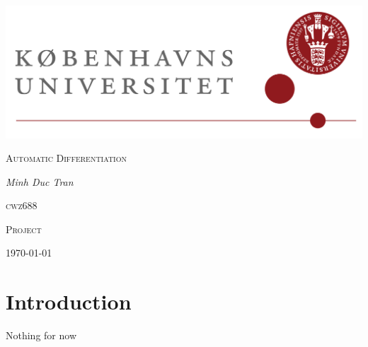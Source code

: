 
\usepackage{hyperref}

\author{Minh}

	\begin{titlepage}
		\centering
		\includegraphics[width=\textwidth]{KuLogo.png}
		\par\vspace{1cm}
		\vspace{1cm}
		{\scshape\Large Automatic Differentiation \\
			\par}
		\vspace{1.5cm}
		{\Large\itshape  Minh Duc Tran }\\
		\vspace{0.5cm}
		{\scshape\large cwz688 \\ \par}
		\vfill
		{\Large\scshape Project \par}
		\vfill
		\par
		\vfill
		{\large \today\par}
	\end{titlepage}
	\newpage
\section{Introduction}
Nothing for now

